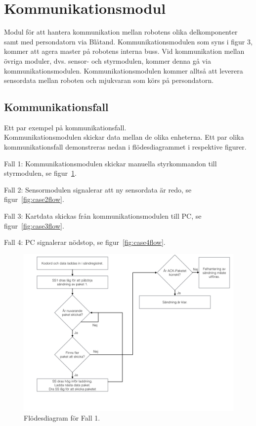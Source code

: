 \documentclass[a4paper,12pt,fleqn]{article}
\begin{document}


\section{Kommunikationsmodul}
Modul för att hantera kommunikation mellan robotens olika delkomponenter samt med persondatorn via Blåtand. Kommunikationsmodulen som syns i figur 3, kommer att agera master på robotens interna buss. Vid kommunikation mellan övriga moduler, dvs. sensor- och styrmodulen, kommer denna gå via kommunikationsmodulen.
Kommunikationsmodulen kommer alltså att leverera sensordata mellan roboten och mjukvaran som körs på persondatorn.

\subsection{Kommunikationsfall}
Ett par exempel på kommunikationsfall. \\

Kommunikationsmodulen skickar data mellan de olika enheterna. Ett par olika kommunikationsfall demonstreras nedan i flödesdiagrammet i respektive figurer.

Fall 1: Kommunikationsmodulen skickar manuella styrkommandon till styrmodulen, se figur~\ref{fig:case1flow}.

Fall 2: Sensormodulen signalerar att ny sensordata är redo, se  figur~\ref{fig:case2flow}.

Fall 3: Kartdata skickas från kommunikationsmodulen till PC, se figur~\ref{fig:case3flow}. 

Fall 4: PC signalerar nödstop, se figur~\ref{fig:case4flow}. 

\begin{figure}[htp] %
  \begin{center}
  \includegraphics[keepaspectratio=true,width=\linewidth]{SPIbild002.jpg}  %
  \end{center}
  \caption{Flödesdiagram för Fall 1.} %
  \label{fig:case1flow}
\end{figure}
\end{document}
